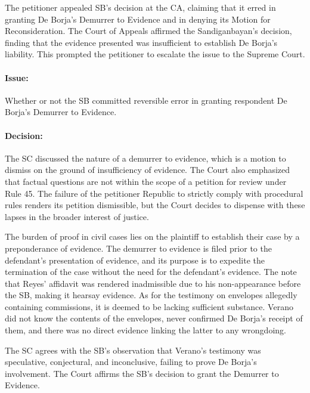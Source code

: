 \documentclass[
12pt,
oneside,
onehalfspacing,
headsepline
]{DigestCollection}
\begin{document}
The petitioner appealed SB's decision at the CA, claiming that it erred in granting De Borja's Demurrer to Evidence and in denying its Motion for Reconsideration. The Court of Appeals affirmed the Sandiganbayan's decision, finding that the evidence presented was insufficient to establish De Borja's liability. This prompted the petitioner to escalate the issue to the Supreme Court.

\paragraph{Issue:}
\label{c30bd770-120e-11ef-aa24-9916ea601717}


Whether or not the SB committed reversible error in granting respondent De Borja's Demurrer to Evidence.

\paragraph{Decision:}
\label{c1365420-120e-11ef-aa24-9916ea601717}


The SC discussed the nature of a demurrer to evidence, which is a motion to dismiss on the ground of insufficiency of evidence. The Court also emphasized that factual questions are not within the scope of a petition for review under Rule 45. The failure of the petitioner Republic to strictly comply with procedural rules renders its petition dismissible, but the Court decides to dispense with these lapses in the broader interest of justice.

The burden of proof in civil cases lies on the plaintiff to establish their case by a preponderance of evidence. The demurrer to evidence is filed prior to the defendant's presentation of evidence, and its purpose is to expedite the termination of the case without the need for the defendant's evidence. The note that Reyes' affidavit was rendered inadmissible due to his non-appearance before the SB, making it hearsay evidence. As for the testimony on envelopes allegedly containing commissions, it is deemed to be lacking sufficient substance. Verano did not know the contents of the envelopes, never confirmed De Borja's receipt of them, and there was no direct evidence linking the latter to any wrongdoing.

The SC agrees with the SB's observation that Verano's testimony was speculative, conjectural, and inconclusive, failing to prove De Borja's involvement. The Court affirms the SB's decision to grant the Demurrer to Evidence.
\end{document}
